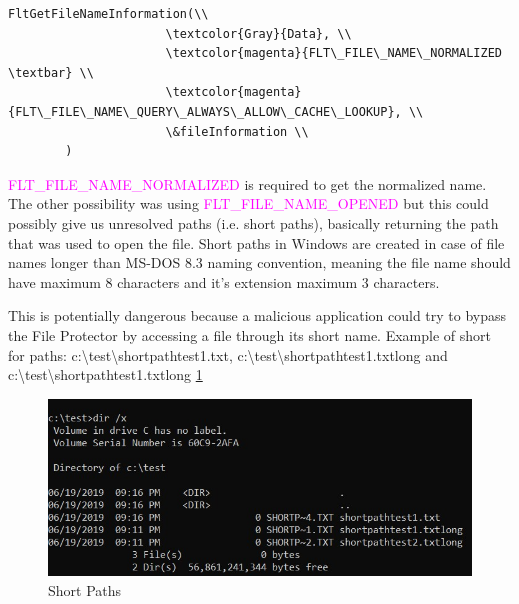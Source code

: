 		\begin{Verbatim}[fontsize=\small, commandchars=\\\{\}]
		FltGetFileNameInformation(\\
		              \textcolor{Gray}{Data}, \\
		              \textcolor{magenta}{FLT\_FILE\_NAME\_NORMALIZED \textbar} \\
		              \textcolor{magenta}{FLT\_FILE\_NAME\_QUERY\_ALWAYS\_ALLOW\_CACHE\_LOOKUP}, \\
		              \&fileInformation \\
		)
		\end{Verbatim}
		
		\textcolor{magenta}{FLT\_FILE\_NAME\_NORMALIZED} is required to get the normalized name. The other possibility was using \textcolor{magenta}{FLT\_FILE\_NAME\_OPENED} but this could possibly give us unresolved paths (i.e. short paths), basically returning the path that was used to open the file. Short paths in Windows are created in case of file names longer than MS-DOS 8.3 naming convention, meaning the file name should have maximum 8 characters and it's extension maximum 3 characters.
		
		This is potentially dangerous because a malicious application could try to bypass the File Protector by accessing a file through its short name. Example of short for paths: c:\textbackslash test\textbackslash shortpathtest1.txt, c:\textbackslash test\textbackslash shortpathtest1.txtlong and \\ c:\textbackslash test\textbackslash shortpathtest1.txtlong \ref{fig:ShortPaths}
		
		\begin{figure}[h!]
			\begin{center}
				\includegraphics{images/ShortPaths.jpg}
				\caption{Short Paths}
				\label{fig:ShortPaths}
			\end{center}
		\end{figure}
	
